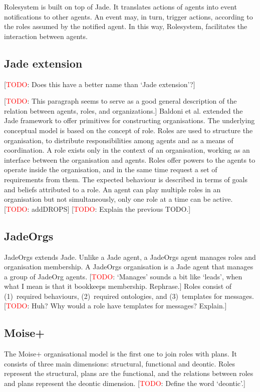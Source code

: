 \documentclass{article}
\newcommand{\todo}[1]{[\textcolor{red}{TODO}: #1]}
\begin{document}
Rolesystem is built on top of Jade. It translates actions of
agents into event notifications to other agents. An event may,
in turn, trigger actions, according to the roles assumed by
the notified agent. In this way, Rolesystem, facilitates the
interaction between agents.

\subsection{Jade extension}

\todo{Does this have a better name than `Jade extension'?}

\todo{This paragraph seems to serve as a good general description
of the relation between agents, roles, and organizations.}
Baldoni et al. extended the Jade framework to offer primitives
for constructing organisations. The underlying conceptual model
is based on the concept of role. Roles are used to structure the
organisation, to distribute responsibilities among agents and as
a means of coordination. A role exists only in the context of an
organisation, working as an interface between the organisation and
agents. Roles offer powers to the agents to operate inside the
organisation, and in the same time request a set of requirements
from them. The expected behaviour is described in terms of goals and
beliefs attributed to a role. An agent can play multiple roles in an
organisation but not simultaneously, only one role at a time can be
active. \todo{addDROPS} \todo{Explain the previous TODO.}

\subsection{JadeOrgs}

JadeOrgs extends Jade. Unlike a Jade agent, a JadeOrgs
agent manages roles and organisation membership. A JadeOrgs
organisation is a Jade agent that manages a group of JadeOrg
agents. \todo{`Manages' sounds a bit like `leads', when what I
mean is that it bookkeeps membership. Rephrase.} Roles consist
of (1)~required behaviours, (2)~required ontologies, and
(3)~templates for messages. \todo{Huh? Why would a role have
templates for messages? Explain.}

\subsection{Moise+} 

The Moise+ organisational model is the first one to join roles
with plans. It consists of three main dimensions: structural,
functional and deontic. Roles represent the structural, plans
are the functional, and the relations between roles and
plans represent the deontic dimension. \todo{Define the word
`deontic'.}
\end{document}
